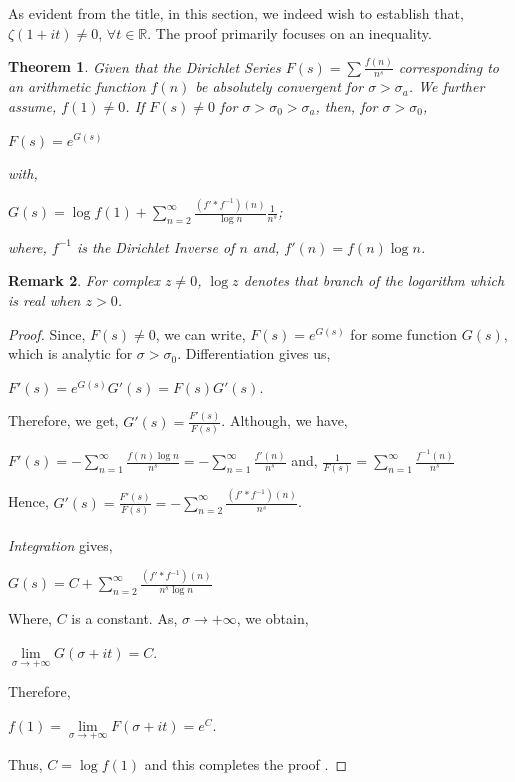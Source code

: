 \documentclass[article,12pt]{elsarticle}
\newtheorem{thm}{Theorem}[section]
\newtheorem{rmk}[thm]{Remark}
\begin{document}
	As evident from the title, in this section, we indeed wish to establish that, $\zeta(1+it)\neq 0$,   $\forall t\in \mathbb{R}$. The proof primarily focuses on an inequality.
	\begin{thm}\label{thm12}
		Given that the \textit{Dirichlet Series} $F(s)=\sum \frac{f(n)}{n^{s}}$ corresponding to an arithmetic function  $f(n)$ be absolutely convergent for $\sigma>\sigma_{a}$. We further assume, $f(1)\neq 0$. If $F(s)\neq 0$ for $\sigma>\sigma_{0}>\sigma_{a}$, then, for $\sigma>\sigma_{0}$, 
		\begin{center}
			$F(s)=e^{G(s)}$
		\end{center}
		with, 
		\begin{center}
			$G(s)=\log f(1)+\sum\limits_{n=2}^{\infty}\frac{(f'*f^{-1})(n)}{\log n}\frac{1}{n^{s}}$;
		\end{center}
		where, $f^{-1}$ is the \textit{Dirichlet Inverse }of $n$ and, $f'(n)=f(n)\log n$.
		
	\end{thm}
	\begin{rmk}\label{rmk5}
		For complex $z\neq 0$, $\log z$ denotes that branch of the logarithm which is real when $z>0 $.
	\end{rmk} 
	\begin{proof}
		Since, $F(s)\neq 0$, we can write, 	$F(s)=e^{G(s)}$ for some function $G(s)$, which is analytic for $\sigma>\sigma_{0}$. Differentiation gives us,
		\begin{center}
			$F'(s)=e^{G(s)}G'(s)=F(s)G'(s)$.
		\end{center} 
		Therefore, we get,    $G'(s)=\frac{F'(s)}{F(s)}$. Although, we have,
		\begin{center}
			$F'(s)=-\sum\limits_{n=1}^{\infty}\frac{f(n)\log n}{n^{s}}=-\sum\limits_{n=1}^{\infty}\frac{f'(n)}{n^{s}}$  \hspace{20pt} and,          \hspace{10pt} $\frac{1}{F(s)}=\sum\limits_{n=1}^{\infty}\frac{f^{-1}(n)}{n^{s}}$
		\end{center}
		Hence,   $G'(s)=\frac{F'(s)}{F(s)}=-\sum\limits_{n=2}^{\infty}\frac{(f'*f^{-1})(n)}{n^{s}}$.\\\\
		\textit{Integration} gives,
		\begin{center}
			$G(s)=C+\sum\limits_{n=2}^{\infty}\frac{(f'*f^{-1})(n)}{n^{s}\log n}$
		\end{center}
		Where, $C$ is a constant. As, $\sigma\rightarrow +\infty$, we obtain,
		\begin{center}
			$\lim\limits_{\sigma\rightarrow +\infty}G(\sigma +it)=C$.
		\end{center}
		Therefore, 
		\begin{center}
			$f(1)=\lim\limits_{\sigma\rightarrow +\infty}F(\sigma +it)=e^{C}$.
		\end{center}
		Thus, $C=\log f(1)$ and this completes the proof . 
	\end{proof}
\end{document}
